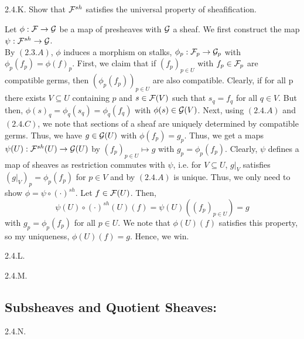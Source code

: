 \begin{exercise}{2.4.K.} 
    Show that $\mathcal{F}^{sh}$ satisfies the universal property of sheafification. 
\end{exercise}
\begin{solution}
    Let $\phi: \mathcal{F} \to \mathcal{G}$ be a map of presheaves with $\mathcal{G}$ a sheaf. We first construct the map $\psi: \mathcal{F}^{sh} \to \mathcal{G}$. \\
    By $(2.3.A)$, $\phi$ induces a morphism on stalks, $\phi_p: \mathcal{F}_p \to \mathcal{G}_p$ with $\phi_p(f_p) = \phi(f)_p$. First, we claim that if $(f_p)_{p \in U}$ with $f_p \in \mathcal{F}_p$ are compatible germs, then $(\phi_p(f_p))_{p \in U}$ are also compatible. Clearly, if for all p there exists $V \subseteq U$ containing $p$ and $s \in \mathcal{F}(V)$ such that $s_q = f_q$ for all $q \in V$. But then, $\phi(s)_q = \phi_q(s_q) = \phi_q(f_q)$ with $\phi(s) \in \mathcal{G}(V)$. Next, using $(2.4.A)$ and $(2.4.C)$, we note that sections of a sheaf are uniquely determined by compatible germs. Thus, we have $g \in \mathcal{G}(U)$ with $\phi(f_p) = g_p$. Thus, we get a maps $\psi(U): \mathcal{F}^{sh}(U) \to \mathcal{G}(U)$ by $(f_p)_{p \in U} \mapsto g$ with $g_p = \phi_p(f_p)$. \bbni    
    Clearly, $\psi$ defines a map of sheaves as restriction commutes with $\psi$, i.e. for $V \subseteq U$, $g|_V$ satisfies $(g|_V)_p = \phi_p(f_p)$ for $p \in V$ and by $(2.4.A)$ is unique. Thus, we only need to show $\phi = \psi \circ (\cdot)^{sh}$. \bbni 
    Let $f \in \mathcal{F}(U)$. Then, 
    \[ \psi(U) \circ (\cdot)^{sh}(U)(f) = \psi(U)((f_p)_{p \in U}) = g \]
    with $g_p = \phi_p(f_p)$ for all $p \in U$. We note that $\phi(U)(f)$ satisfies this property, so my uniqueness, $\phi(U)(f) = g$. Hence, we win. 
\end{solution}

\begin{exercise}{2.4.L.}

\end{exercise}
\begin{solution}
    \todo{}
\end{solution}

\begin{exercise}{2.4.M.} 

\end{exercise}
\begin{solution}
    \todo{}

\end{solution}

\subsection{Subsheaves and Quotient Sheaves:}
\begin{exercise}{2.4.N.} 

\end{exercise}
\begin{solution}
    \todo{}

\end{solution}

